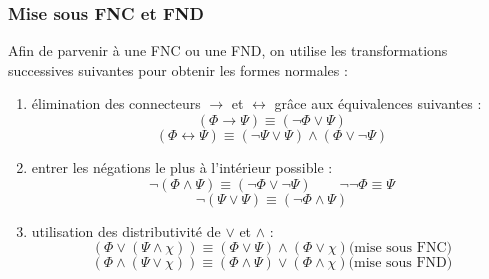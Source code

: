 \subsubsection{Mise sous FNC et FND}\label{sec:mettreFNCFND}
Afin de parvenir à une FNC ou une FND, on utilise les transformations successives suivantes pour obtenir les formes normales :
\begin{enumerate}
    \item élimination des connecteurs $\rightarrow$ et $\leftrightarrow$ grâce aux équivalences suivantes :
    \begin{equation*}
        (\Phi\rightarrow\Psi)\equiv(\neg\Phi\vee\Psi)
    \end{equation*}
    \begin{equation*}
        (\Phi\leftrightarrow\Psi)\equiv(\neg\Psi\vee\Psi)\wedge(\Phi\vee\neg\Psi)
    \end{equation*}
    \item entrer les négations le plus à l'intérieur possible :
    \begin{equation*}
        \neg(\Phi\wedge\Psi)\equiv(\neg\Phi\vee\neg\Psi) \qquad \neg\neg\Phi \equiv \Psi
    \end{equation*}
    \begin{equation*}
        \neg(\Psi\vee\Psi)\equiv(\neg\Phi\wedge\Psi)
    \end{equation*}
    \item utilisation des distributivité de $\vee$ et $\wedge$ :
    \begin{equation*}
        (\Phi\vee(\Psi\wedge\chi )) \equiv (\Phi\vee\Psi)\wedge(\Phi\vee\chi)\text{(mise sous FNC)}
    \end{equation*}
    \begin{equation*}
        (\Phi\wedge(\Psi\vee\chi)) \equiv (\Phi\wedge\Psi)\vee(\Phi\wedge\chi)\text{(mise sous FND)}
    \end{equation*}
\end{enumerate}

